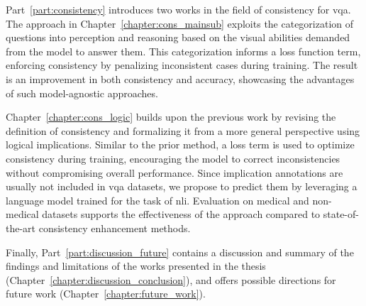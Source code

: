 Part~\ref{part:consistency} introduces two works in the field of consistency for \gls{vqa}. The approach in Chapter~\ref{chapter:cons_mainsub} exploits the categorization of questions into perception and reasoning based on the visual abilities demanded from the model to answer them. This categorization informs a loss function term, enforcing consistency by penalizing inconsistent cases during training. The result is an improvement in both consistency and accuracy, showcasing the advantages of such model-agnostic approaches. 

Chapter~\ref{chapter:cons_logic} builds upon the previous work by revising the definition of consistency and formalizing it from a more general perspective using logical implications. Similar to the prior method, a loss term is used to optimize consistency during training, encouraging the model to correct inconsistencies without compromising overall performance. Since implication annotations are usually not included in \gls{vqa} datasets, we propose to predict them by leveraging a language model trained for the task of \gls{nli}. Evaluation on medical and non-medical datasets supports the effectiveness of the approach compared to state-of-the-art consistency enhancement methods.

Finally, Part~\ref{part:discussion_future} contains a discussion and summary of the findings and limitations of the works presented in the thesis (Chapter~\ref{chapter:discussion_conclusion}), and offers possible directions for future work (Chapter~\ref{chapter:future_work}).


